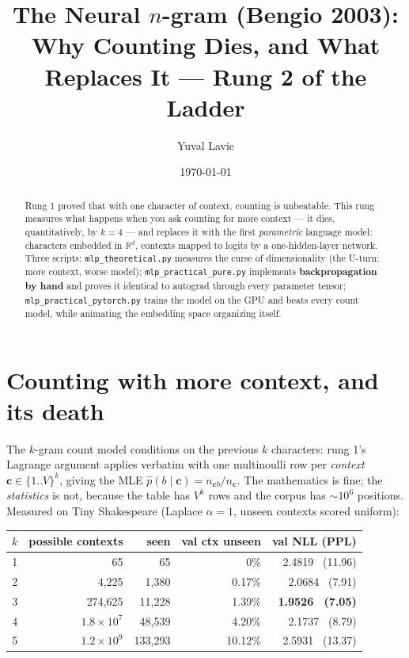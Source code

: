 \documentclass[11pt]{article}
\title{The Neural $n$-gram (Bengio 2003):\\
Why Counting Dies, and What Replaces It --- Rung 2 of the Ladder}
\author{Yuval Lavie}
\date{\today}
\begin{document}
\maketitle

\begin{abstract}
Rung 1 proved that with one character of context, counting is
unbeatable. This rung measures what happens when you ask counting for
more context --- it dies, quantitatively, by $k=4$ --- and replaces it
with the first \emph{parametric} language model: characters embedded in
$\mathbb{R}^d$, contexts mapped to logits by a one-hidden-layer
network. Three scripts: \texttt{mlp\_theoretical.py} measures the
curse of dimensionality (the U-turn: more context, worse model);
\texttt{mlp\_practical\_pure.py} implements \textbf{backpropagation by
hand} and proves it identical to autograd through every parameter
tensor; \texttt{mlp\_practical\_pytorch.py} trains the model on the GPU
and beats every count model, while animating the embedding space
organizing itself.
\end{abstract}

\section{Counting with more context, and its death}

The $k$-gram count model conditions on the previous $k$ characters:
rung 1's Lagrange argument applies verbatim with one multinoulli row
per \emph{context} $\mathbf{c} \in \{1..V\}^k$, giving the MLE
$\hat p(b \mid \mathbf{c}) = n_{\mathbf{c}b}/n_{\mathbf{c}}$. The
mathematics is fine; the \emph{statistics} is not, because the table
has $V^k$ rows and the corpus has $\sim$$10^6$ positions. Measured on
Tiny Shakespeare (Laplace $\alpha = 1$, unseen contexts scored uniform):

\begin{center}
\begin{tabular}{rrrrr}
\toprule
$k$ & possible contexts & seen & val ctx unseen & val NLL (PPL)\\
\midrule
1 & 65 & 65 & 0\% & 2.4819 \ (11.96)\\
2 & 4{,}225 & 1{,}380 & 0.17\% & 2.0684 \ (7.91)\\
3 & 274{,}625 & 11{,}228 & 1.39\% & \textbf{1.9526 \ (7.05)}\\
4 & $1.8\times10^{7}$ & 48{,}539 & 4.20\% & 2.1737 \ (8.79)\\
5 & $1.2\times10^{9}$ & 133{,}293 & 10.12\% & 2.5931 \ (13.37)\\
\bottomrule
\end{tabular}
\end{center}
\end{document}
